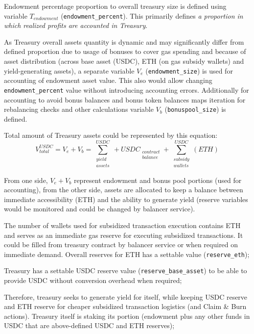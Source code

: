 \documentclass[12pt]{article}
\begin{document}
Endowment percentage proportion to overall treasury size is defined using variable $T_{\mathit{endowment}}$ (\texttt{endowment\_percent}). This primarily defines \emph{a proportion in which realized profits are accounted in Treasury}.

As Treasury overall assets quantity is dynamic and may significantly differ from defined proportion due to usage of bonuses to cover gas spending and because of asset distribution (across base asset (USDC), ETH (on gas subsidy wallets) and yield-generating assets), a separate variable $V_{e}$ (\texttt{endowment\_size}) is used for accounting of endowment asset value. This also would allow changing \texttt{endowment\_percent} value without introducing accounting errors. Additionally for accounting to avoid bonus balances and bonus token balances maps iteration for rebalancing checks and other calculations variable $V_{b}$ (\texttt{bonuspool\_size}) is defined.

Total amount of Treasury assets could be represented by this equation:
\begin{equation}
V_{total}^{\mathit{USDC}} = V_{e} + V_{b} = \sum^{\mathit{USDC}}_{\substack{yield\\assets}} + \mathit{USDC}_{\substack{contract\\balance}} + \sum^{\mathit{USDC}}_{\substack{subsidy\\wallets}}(\mathit{ETH})
\end{equation}

From one side, $V_{e} + V_{b}$ represent endowment and bonus pool portions (used for accounting), from the other side, assets are allocated to keep a balance between immediate accessibility (ETH) and the ability to generate yield (reserve variables would be monitored and could be changed by balancer service).

The number of wallets used for subsidized transaction execution contains ETH and serves as an immediate gas reserve for executing subsidized transactions. It could be filled from treasury contract by balancer service or when required on immediate demand. Overall reserves for ETH has a settable value (\texttt{reserve\_eth});

Treasury has a settable USDC reserve value (\texttt{reserve\_base\_asset}) to be able to provide USDC without conversion overhead when required;

Therefore, treasury seeks to generate yield for itself, while keeping USDC reserve
and ETH reserve for cheaper subsidized transaction logistics (and Claim \& Burn actions). Treasury itself is staking its portion (endowment plus any other funds in USDC that are above-defined USDC and ETH reserves);
\end{document}
